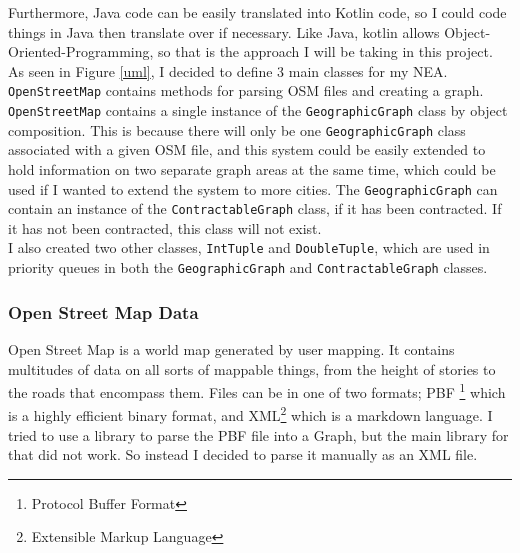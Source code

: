 \documentclass[11pt,twoside,a4paper]{article}
\begin{document}
Furthermore, Java code can be easily translated into Kotlin code, so I could code things in Java then translate over if necessary. Like Java, kotlin allows Object-Oriented-Programming, so that
is the approach I will be taking in this project.\\
As seen in Figure \ref{uml}, I decided to define 3 main classes for my NEA. \texttt{OpenStreetMap} contains methods for parsing OSM files and creating a graph.
\texttt{OpenStreetMap} contains a single instance of the \texttt{GeographicGraph} class by object composition. This is because there will only be one \texttt{GeographicGraph}
class associated with a given OSM file, and this system could be easily extended to hold information on two separate graph areas at the same time, which could be used if I wanted
to extend the system to more cities. The \texttt{GeographicGraph} can contain an instance of the \texttt{ContractableGraph} class, if it has been contracted. If it has not been contracted,
this class will not exist.\\
I also created two other classes, \texttt{IntTuple} and \texttt{DoubleTuple}, which are used in priority queues in both the \texttt{GeographicGraph} and \texttt{ContractableGraph} classes.\\
\subsubsection{Open Street Map Data}
Open Street Map is a world map generated by user mapping. It contains multitudes of data on all sorts of mappable things, from the height of stories to the roads that encompass them.
Files can be in one of two formats; PBF \footnote{Protocol Buffer Format} which is a highly efficient binary format, and XML\footnote{Extensible Markup Language} which is a markdown language. I tried to use a library to parse 
the PBF file into a Graph, but the main library for that did not work. So instead I decided to parse it manually as an XML file.\\
\end{document}
